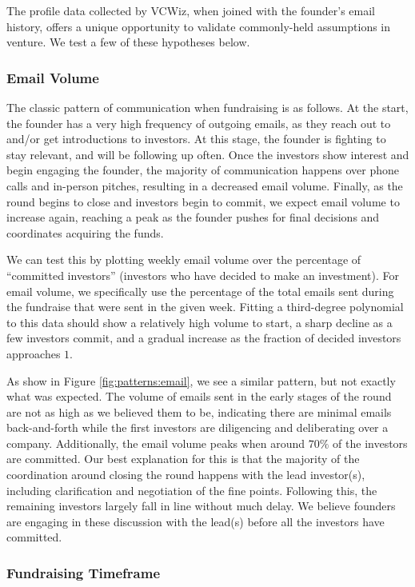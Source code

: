 The profile data collected by VCWiz, when joined with the founder's email history, offers a unique opportunity to validate commonly-held assumptions in venture. We test a few of these hypotheses below.

\subsubsection{Email Volume}

The classic pattern of communication when fundraising is as follows. At the start, the founder has a very high frequency of outgoing emails, as they reach out to and/or get introductions to investors. At this stage, the founder is fighting to stay relevant, and will be following up often. Once the investors show interest and begin engaging the founder, the majority of communication happens over phone calls and in-person pitches, resulting in a decreased email volume. Finally, as the round begins to close and investors begin to commit, we expect email volume to increase again, reaching a peak as the founder pushes for final decisions and coordinates acquiring the funds.

We can test this by plotting weekly email volume over the percentage of ``committed investors'' (investors who have decided to make an investment). For email volume, we specifically use the percentage of the total emails sent during the fundraise that were sent in the given week. Fitting a third-degree polynomial to this data should show a relatively high volume to start, a sharp decline as a few investors commit, and a gradual increase as the fraction of decided investors approaches $1$.

As show in Figure \ref{fig:patterns:email}, we see a similar pattern, but not exactly what was expected. The volume of emails sent in the early stages of the round are not as high as we believed them to be, indicating there are minimal emails back-and-forth while the first investors are diligencing and deliberating over a company. Additionally, the email volume peaks when around $70\%$ of the investors are committed. Our best explanation for this is that the majority of the coordination around closing the round happens with the lead investor(s), including clarification and negotiation of the fine points. Following this, the remaining investors largely fall in line without much delay. We believe founders are engaging in these discussion with the lead(s) before all the investors have committed.

\subsubsection{Fundraising Timeframe}
\label{ch5:timeline}

